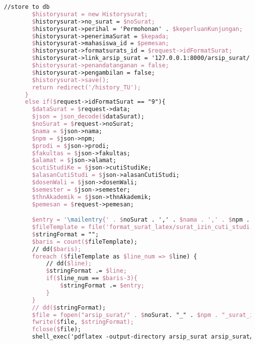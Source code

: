 \begin{lstlisting}[language=tex,basicstyle=\tiny,caption=HistorysuratController.php]
        //store to db
        $historysurat = new Historysurat;
        $historysurat->no_surat = $noSurat;
        $historysurat->perihal = 'Permohonan' . $keperluanKunjungan;
        $historysurat->penerimaSurat = $kepada;
        $historysurat->mahasiswa_id = $pemesan;
        $historysurat->formatsurats_id = $request->idFormatSurat;
        $historysurat->link_arsip_surat = '127.0.0.1:8000/arsip_surat/' . $noSurat. '_' . $npm . '_surat_pengantar_studi_lapangan_5orang.pdf';
        $historysurat->penandatanganan = false;
        $historysurat->pengambilan = false;
        $historysurat->save();
        return redirect('/history_TU');
      }
      else if($request->idFormatSurat == "9"){
        $dataSurat = $request->data;
        $json = json_decode($dataSurat);
        $noSurat = $request->noSurat;
        $nama = $json->nama;
        $npm = $json->npm;
        $prodi = $json->prodi;
        $fakultas = $json->fakultas;
        $alamat = $json->alamat;
        $cutiStudiKe = $json->cutiStudiKe;
        $alasanCutiStudi = $json->alasanCutiStudi;
        $dosenWali = $json->dosenWali;
        $semester = $json->semester;
        $thnAkademik = $json->thnAkademik;
        $pemesan = $request->pemesan;

        $entry = '\mailentry{' . $noSurat . ',' . $nama . ',' . $npm . ',' . $prodi . ',' . $fakultas . ',' . $alamat . ',' . $cutiStudiKe . ',' . $alasanCutiStudi . ',' . $dosenWali . ',' . $semester . ',' . $thnAkademik . '}';
        $fileTemplate = file('format_surat_latex/surat_izin_cuti_studi.tex');
        $stringFormat = "";
        $baris = count($fileTemplate);
        // dd($baris);
        foreach ($fileTemplate as $line_num => $line) {
            // dd($line);
            $stringFormat .= $line;
            if($line_num == $baris-3){
                $stringFormat .= $entry;
            }
        }
        // dd($stringFormat);
        $file = fopen("arsip_surat/" . $noSurat. "_" . $npm . "_surat_izin_cuti_studi.tex", "w");
        fwrite($file, $stringFormat);
        fclose($file);
        shell_exec('pdflatex -output-directory arsip_surat arsip_surat/' . $noSurat . '_' . $npm . '_surat_izin_cuti_studi.tex');


\end{lstlisting}
